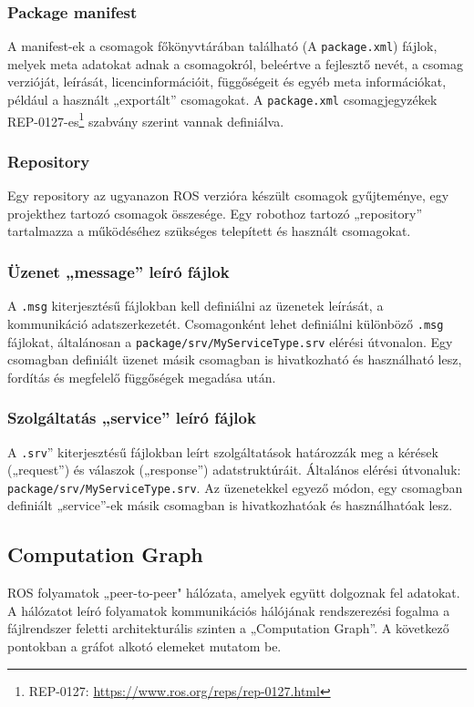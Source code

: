 \subsubsection{Package manifest}
A manifest-ek a csomagok főkönyvtárában található (A \verb|package.xml|) fájlok, melyek meta adatokat adnak a csomagokról, beleértve a fejlesztő nevét, a csomag verzióját, leírását, licencinformációit, függőségeit és egyéb meta információkat, például a használt „exportált” csomagokat. A \verb|package.xml| csomagjegyzékek REP-0127-es\footnote{REP-0127: \url{https://www.ros.org/reps/rep-0127.html}} szabvány szerint vannak definiálva.

\subsubsection{Repository}
Egy repository az ugyanazon ROS verzióra készült csomagok gyűjteménye, egy projekthez tartozó csomagok összesége. Egy robothoz tartozó „repository” tartalmazza a működéséhez szükséges telepített és használt csomagokat.

\subsubsection{Üzenet „message” leíró fájlok}
A \verb|.msg| kiterjesztésű fájlokban kell definiálni az üzenetek leírását, a kommunikáció adatszerkezetét. Csomagonként lehet definiálni különböző \verb|.msg| fájlokat, általánosan a \verb|package/srv/MyServiceType.srv| elérési útvonalon. Egy csomagban definiált üzenet másik csomagban is hivatkozható és használható lesz, fordítás és megfelelő függőségek megadása után.

\subsubsection{Szolgáltatás „service” leíró fájlok}
A \verb|.srv|” kiterjesztésű fájlokban leírt szolgáltatások határozzák meg a kérések („request”) és válaszok („response”) adatstruktúráit. Általános elérési útvonaluk: \verb|package/srv/MyServiceType.srv|. Az üzenetekkel egyező módon, egy csomagban definiált „service”-ek másik csomagban is hivatkozhatóak és használhatóak lesz.

\subsection{Computation Graph}
ROS folyamatok „peer-to-peer" hálózata, amelyek együtt dolgoznak fel adatokat. A hálózatot leíró folyamatok kommunikációs hálójának rendszerezési fogalma a fájlrendszer feletti architekturális szinten a „Computation Graph”. A következő pontokban a gráfot alkotó elemeket mutatom be.

